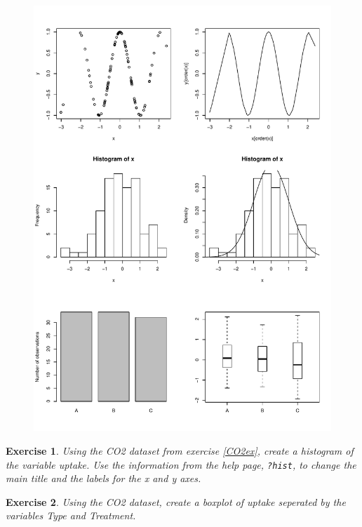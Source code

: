\documentclass{article}\usepackage[]{graphicx}\usepackage[]{color}
\makeatletter
\def\maxwidth{ %
  \ifdim\Gin@nat@width>\linewidth
    \linewidth
  \else
    \Gin@nat@width
  \fi
}
\newenvironment{knitrout}{}{} %
\newtheorem{exercise}{Exercise}[section]
\makeatother
\begin{document}
\begin{figure}
\begin{knitrout}
\color{fgcolor}
\includegraphics[width=\maxwidth]{figure/unnamed-chunk-16-1} 

\end{knitrout}
\end{figure}

\begin{exercise}
Using the CO2 dataset from exercise \ref{CO2ex}, create a histogram of the variable uptake. Use the information from the help page, \texttt{?hist}, to change the main title and the labels for the x and y axes.
\end{exercise}

\begin{exercise}
Using the CO2 dataset, create a boxplot of uptake seperated by the variables Type and Treatment.
\end{exercise}
\end{document}
